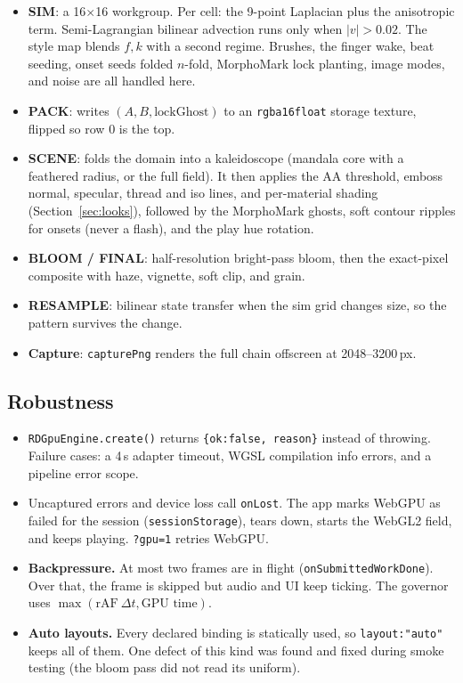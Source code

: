 \documentclass[10pt,a4paper]{article}
\newcommand{\code}[1]{\texttt{\small #1}}
\begin{document}
\begin{itemize}
\item \textbf{SIM}: a 16$\times$16 workgroup. Per cell: the 9-point Laplacian plus the anisotropic term.
Semi-Lagrangian bilinear advection runs only when $|v|>0.02$. The style map blends $f,k$ with a second regime. Brushes, the finger wake,
beat seeding, onset seeds folded $n$-fold, MorphoMark lock planting, image modes, and noise are all handled here.
\item \textbf{PACK}: writes $(A,B,\text{lockGhost})$ to an \code{rgba16float} storage texture, flipped so row 0 is the top.
\item \textbf{SCENE}: folds the domain into a kaleidoscope (mandala core with a feathered radius, or the full field). It then
applies the AA threshold, emboss normal, specular, thread and iso lines, and per-material shading (Section~\ref{sec:looks}), followed by
the MorphoMark ghosts, soft contour ripples for onsets (never a flash), and the play hue rotation.
\item \textbf{BLOOM / FINAL}: half-resolution bright-pass bloom, then the exact-pixel composite with haze, vignette, soft clip, and grain.
\item \textbf{RESAMPLE}: bilinear state transfer when the sim grid changes size, so the pattern survives the change.
\item \textbf{Capture}: \code{capturePng} renders the full chain offscreen at 2048--3200\,px.
\end{itemize}

\subsection{Robustness}
\begin{itemize}
\item \code{RDGpuEngine.create()} returns \code{\{ok:false, reason\}} instead of throwing. Failure cases: a 4\,s adapter timeout,
WGSL compilation info errors, and a pipeline error scope.
\item Uncaptured errors and device loss call \code{onLost}. The app marks WebGPU as failed for the session
(\code{sessionStorage}), tears down, starts the WebGL2 field, and keeps playing. \code{?gpu=1} retries WebGPU.
\item \textbf{Backpressure.} At most two frames are in flight (\code{onSubmittedWorkDone}). Over that, the
frame is skipped but audio and UI keep ticking. The governor uses $\max(\text{rAF}\ \Delta t, \text{GPU time})$.
\item \textbf{Auto layouts.} Every declared binding is statically used, so \code{layout:"auto"} keeps all of them. One defect of this
kind was found and fixed during smoke testing (the bloom pass did not read its uniform).
\end{itemize}
\end{document}
